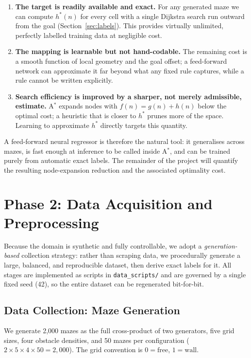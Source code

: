 \documentclass[11pt]{article}
\begin{document}
\begin{enumerate}
  \item \textbf{The target is readily available and exact.} For any generated maze we can
  compute $h^\ast(n)$ for every cell with a single Dijkstra search run outward from the
  goal (Section~\ref{sec:labels}). This provides virtually unlimited, perfectly labelled
  training data at negligible cost.
  \item \textbf{The mapping is learnable but not hand-codable.} The remaining cost is a
  smooth function of local geometry and the goal offset; a feed-forward network can
  approximate it far beyond what any fixed rule captures, while a rule cannot be written
  explicitly.
  \item \textbf{Search efficiency is improved by a sharper, not merely admissible,
  estimate.} A$^\ast$ expands nodes with $f(n)=g(n)+h(n)$ below the optimal cost; a
  heuristic that is closer to $h^\ast$ prunes more of the space. Learning to approximate
  $h^\ast$ directly targets this quantity.
\end{enumerate}

A feed-forward neural regressor is therefore the natural tool: it generalises across
mazes, is fast enough at inference to be called inside A$^\ast$, and can be trained
purely from automatic exact labels. The remainder of the project will quantify the
resulting node-expansion reduction and the associated optimality cost.

\section{Phase 2: Data Acquisition and Preprocessing}
Because the domain is synthetic and fully controllable, we adopt a \emph{generation-based}
collection strategy: rather than scraping data, we procedurally generate a large,
balanced, and reproducible dataset, then derive exact labels for it. All stages are
implemented as scripts in \texttt{data\_scripts/} and are governed by a single fixed seed
(42), so the entire dataset can be regenerated bit-for-bit.

\subsection{Data Collection: Maze Generation}
We generate 2{,}000 mazes as the full cross-product of two generators, five grid sizes,
four obstacle densities, and 50 mazes per configuration
($2 \times 5 \times 4 \times 50 = 2{,}000$). The grid convention is
$0=\text{free}$, $1=\text{wall}$.
\end{document}

